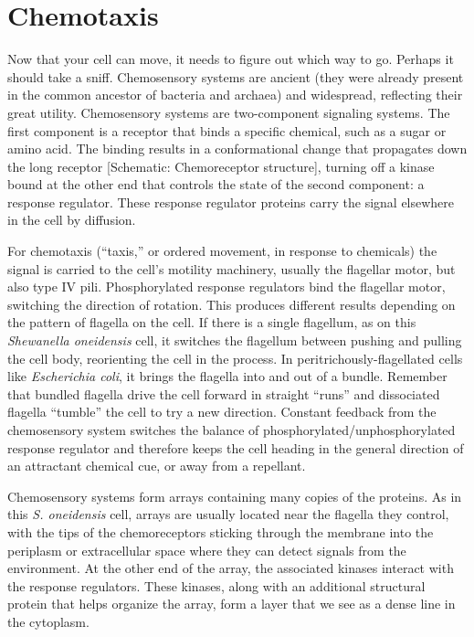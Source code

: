 \documentclass[]{tufte-book}
\begin{document}
\section{Chemotaxis}\label{chemotaxis}

Now that your cell can move, it needs to figure out which way to go.
Perhaps it should take a sniff. Chemosensory systems are ancient (they
were already present in the common ancestor of bacteria and archaea) and
widespread, reflecting their great utility. Chemosensory systems are
two-component signaling systems. The first component is a receptor that
binds a specific chemical, such as a sugar or amino acid. The binding
results in a conformational change that propagates down the long
receptor {[}Schematic: Chemoreceptor structure{]}, turning off a kinase
bound at the other end that controls the state of the second component:
a response regulator. These response regulator proteins carry the signal
elsewhere in the cell by diffusion.

For chemotaxis (``taxis,'' or ordered movement, in response to
chemicals) the signal is carried to the cell's motility machinery,
usually the flagellar motor, but also type IV pili. Phosphorylated
response regulators bind the flagellar motor, switching the direction of
rotation. This produces different results depending on the pattern of
flagella on the cell. If there is a single flagellum, as on this
\emph{Shewanella oneidensis} cell, it switches the flagellum between
pushing and pulling the cell body, reorienting the cell in the process.
In peritrichously-flagellated cells like \emph{Escherichia coli}, it
brings the flagella into and out of a bundle. Remember that bundled
flagella drive the cell forward in straight ``runs'' and dissociated
flagella ``tumble'' the cell to try a new direction. Constant feedback
from the chemosensory system switches the balance of
phosphorylated/unphosphorylated response regulator and therefore keeps
the cell heading in the general direction of an attractant chemical cue,
or away from a repellant.

Chemosensory systems form arrays containing many copies of the proteins.
As in this \emph{S. oneidensis} cell, arrays are usually located near
the flagella they control, with the tips of the chemoreceptors sticking
through the membrane into the periplasm or extracellular space where
they can detect signals from the environment. At the other end of the
array, the associated kinases interact with the response regulators.
These kinases, along with an additional structural protein that helps
organize the array, form a layer that we see as a dense line in the
cytoplasm.
\end{document}
